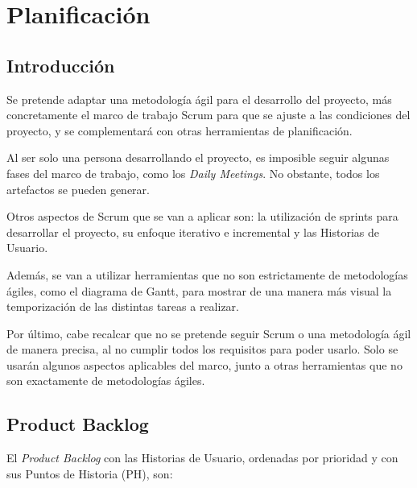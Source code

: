 \chapter{Planificación}

\section{Introducción}

Se pretende adaptar una metodología ágil para el desarrollo del proyecto, más concretamente el marco de trabajo Scrum para que se ajuste a las condiciones del proyecto, y se complementará con otras herramientas de planificación.

\bigskip

Al ser solo una persona desarrollando el proyecto, es imposible seguir algunas fases del marco de trabajo, como los \textit{Daily Meetings}. No obstante, todos los artefactos se pueden generar.

\bigskip

Otros aspectos de Scrum que se van a aplicar son: la utilización de sprints para desarrollar el proyecto, su enfoque iterativo e incremental y las Historias de Usuario.

\bigskip

Además, se van a utilizar herramientas que no son estrictamente de metodologías ágiles, como el diagrama de Gantt, para mostrar de una manera más visual la temporización de las distintas tareas a realizar.

\bigskip

Por último, cabe recalcar que no se pretende seguir Scrum o una metodología ágil de manera precisa, al no cumplir todos los requisitos para poder usarlo. Solo se usarán algunos aspectos aplicables del marco, junto a otras herramientas que no son exactamente de metodologías ágiles.


\newpage

\section{Product Backlog}

El \textit{Product Backlog} con las Historias de Usuario, ordenadas por prioridad y con sus Puntos de Historia (PH), son:

